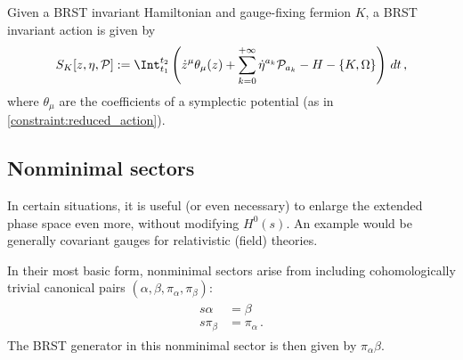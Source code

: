 
    Given a BRST invariant Hamiltonian and gauge-fixing fermion $K$, a BRST invariant action is given by
    \begin{gather}
        S_K[z,\eta,\mathcal{P}] := \Int_{t_1}^{t_2}\left(\dot{z}^\mu\theta_\mu(z)+\sum_{k=0}^{+\infty}\dot{\eta}^{a_k}\mathcal{P}_{a_k}-H-\{K,\Omega\}\right)\,dt\,,
    \end{gather}
    where $\theta_\mu$ are the coefficients of a symplectic potential (as in \cref{constraint:reduced_action}).

\subsection{Nonminimal sectors}\label{section:nonminimal_sectors}

    In certain situations, it is useful (or even necessary) to enlarge the extended phase space even more, without modifying $H^0(s)$. An example would be generally covariant gauges for relativistic (field) theories.
    
    In their most basic form, nonminimal sectors arise from including cohomologically trivial canonical pairs $(\alpha,\beta,\pi_\alpha,\pi_\beta)$:
    \begin{gather}
        \begin{aligned}
            s\alpha &= \beta\\
            s\pi_\beta &= \pi_\alpha\,.
        \end{aligned}
    \end{gather}
    The BRST generator in this nonminimal sector is then given by $\pi_\alpha\beta$.

